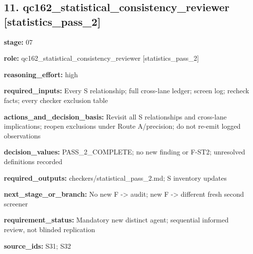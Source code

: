\documentclass[10pt,a4paper]{article}
\begin{document}
\subsection*{11.\allowbreak{} qc162\_\allowbreak{}statistical\_\allowbreak{}consistency\_\allowbreak{}reviewer [statistics\_\allowbreak{}pass\_\allowbreak{}2]}
\textbf{stage:} 07\par
\textbf{role:} qc162\_\allowbreak{}statistical\_\allowbreak{}consistency\_\allowbreak{}reviewer [statistics\_\allowbreak{}pass\_\allowbreak{}2]\par
\textbf{reasoning\_\allowbreak{}effort:} high\par
\textbf{required\_\allowbreak{}inputs:} Every S relationship; full cross-\allowbreak{}lane ledger; screen log; recheck facts; every checker exclusion table\par
\textbf{actions\_\allowbreak{}and\_\allowbreak{}decision\_\allowbreak{}basis:} Revisit all S relationships and cross-\allowbreak{}lane implications; reopen exclusions under Route A/\allowbreak{}precision; do not re-\allowbreak{}emit logged observations\par
\textbf{decision\_\allowbreak{}values:} PASS\_\allowbreak{}2\_\allowbreak{}COMPLETE; no new finding or F-\allowbreak{}ST2; unresolved definitions recorded\par
\textbf{required\_\allowbreak{}outputs:} checkers/\allowbreak{}statistical\_\allowbreak{}pass\_\allowbreak{}2.\allowbreak{}md; S inventory updates\par
\textbf{next\_\allowbreak{}stage\_\allowbreak{}or\_\allowbreak{}branch:} No new F -\allowbreak{}> audit; new F -\allowbreak{}> different fresh second screener\par
\textbf{requirement\_\allowbreak{}status:} Mandatory new distinct agent; sequential informed review, not blinded replication\par
\textbf{source\_\allowbreak{}ids:} S31; S32\par
\end{document}
